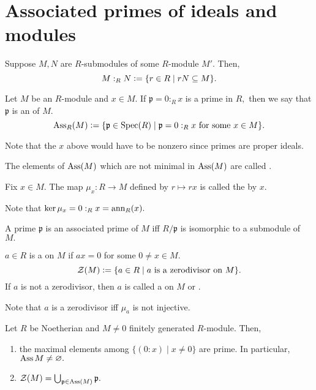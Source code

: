 \documentclass[12pt]{article}	%
\begin{document}
\section{Associated primes of ideals and modules} %
\begin{defn}%
	Suppose $M, N$ are $R$-submodules of some $R$-module $M'.$ Then,
	\begin{equation*} 
		M:_RN \vcentcolon= \{r \in R \mid rN \subset M\}.
	\end{equation*}
\end{defn}
\begin{defn}%
	Let $M$ be an $R$-module and $x \in M.$ If $\mathfrak{p} = 0:_Rx$ is a prime in $R,$ then we say that $\mathfrak{p}$ is an  of $M.$
	\begin{equation*} 
		\Ass_R(M) \vcentcolon= \{\mathfrak{p} \in \Spec(R) \mid \mathfrak{p} = 0 :_R x \text{ for some } x \in M\}.
	\end{equation*}
\end{defn}
Note that the $x$ above would have to be nonzero since primes are proper ideals.
\begin{defn}%
	The elements of $\Ass(M)$ which are not minimal in $\Ass(M)$ are called .
\end{defn}
\begin{defn}%
	Fix $x \in M.$ The map $\mu_x : R \to M$ defined by $r \mapsto rx$ is called the  by $x.$
\end{defn}
Note that $\ker \mu_x = 0:_R x = \ann_{R}(x).$

\begin{prop}
	A prime $\mathfrak{p}$ is an associated prime of $M$ iff $R/\mathfrak{p}$ is isomorphic to a submodule of $M.$
\end{prop}

\begin{defn}%
	$a \in R$ is a  on $M$ if $ax = 0$ for some $0 \neq x \in M.$
	\begin{equation*} 
		\mathcal{Z}(M) \vcentcolon= \{a \in R \mid a \text{ is a zerodivisor on }M\}.
	\end{equation*} 
	If $a$ is not a zerodivisor, then $a$ is called a  on $M$ or .
\end{defn}

Note that $a$ is a zerodivisor iff $\mu_a$ is not injective.

\begin{prop}
	Let $R$ be Noetherian and $M \neq 0$ finitely generated $R$-module. Then,
	\begin{enumerate}
		\item the maximal elements among $\{(0 : x) \mid x \neq 0\}$ are prime. In particular, $\Ass M \neq \emptyset.$
		\item $\mathcal{Z}(M) = \bigcup_{\mathfrak{p} \in \Ass(M)}\mathfrak{p}.$
	\end{enumerate}
\end{prop}
\end{document}
